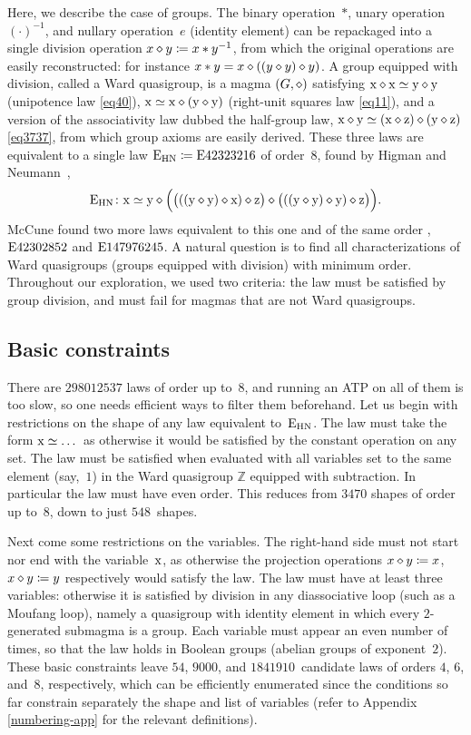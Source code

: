 Here, we describe the case of groups.  The binary operation~$*$, unary operation~$(\cdot )^{-1}$, and nullary operation~$e$ (identity element) can be repackaged into a single division operation $x \diamond y \coloneqq x*y^{-1}$, from which the original operations are easily reconstructed: for instance $x*y=x\diamond((y\diamond y)\diamond y)$.  A group equipped with division, called a Ward quasigroup, is a magma $(G, \diamond)$ satisfying $\mathrm{x} \diamond \mathrm{x} \simeq \mathrm{y} \diamond \mathrm{y}$ (unipotence law \eqref{eq40}), $\mathrm{x} \simeq \mathrm{x} \diamond (\mathrm{y} \diamond \mathrm{y})$ (right-unit squares law \eqref{eq11}), and a version of the associativity law dubbed the half-group law, $\mathrm{x} \diamond \mathrm{y} \simeq (\mathrm{x} \diamond \mathrm{z}) \diamond (\mathrm{y} \diamond \mathrm{z})$ \eqref{eq3737}, from which group axioms are easily derived.
These three laws are equivalent to a single law $\mathrm{E}_{\mathrm{HN}}\coloneqq \mathrm{E}42323216$ of order~$8$, found by Higman and Neumann~\cite{higman-neumann},
\[
\mathrm{E}_{\mathrm{HN}} \colon \mathrm{x} \simeq \mathrm{y} \diamond \Bigl(\bigl(((\mathrm{y} \diamond \mathrm{y}) \diamond \mathrm{x}) \diamond \mathrm{z}\bigr) \diamond \bigl(((\mathrm{y} \diamond \mathrm{y}) \diamond \mathrm{y}) \diamond \mathrm{z}\bigr)\Bigr) .
\]
McCune found two more laws equivalent to this one and of the same order \cite{mccune1993single}, $\mathrm{E}42302852$ and $\mathrm{E}147976245$.  A natural question is to find all characterizations of Ward quasigroups (groups equipped with division) with minimum order.
Throughout our exploration, we used two criteria: the law must be satisfied by group division, and must fail for magmas that are not Ward quasigroups.

\subsection{Basic constraints}

There are $\num{298012537}$ laws of order up to~$8$, and running an ATP on all of them is too slow, so one needs efficient ways to filter them beforehand.  Let us begin with restrictions on the shape of any law equivalent to~$\mathrm{E}_{\mathrm{HN}}$.
The law must take the form $\mathrm{x}\simeq\dots$ as otherwise it would be satisfied by the constant operation on any set.
The law must be satisfied when evaluated with all variables set to the same element (say,~$1$) in the Ward quasigroup $\mathbb{Z}$ equipped with subtraction.  In particular the law must have even order.
This reduces from $\num{3470}$ shapes of order up to~$8$, down to just $548$~shapes.

Next come some restrictions on the variables.
The right-hand side must not start nor end with the variable~$\mathrm{x}$, as otherwise the projection operations $x\diamond y \coloneqq x$, $x\diamond y\coloneqq y$ respectively would satisfy the law.
The law must have at least three variables: otherwise it is satisfied by division in any diassociative loop (such as a Moufang loop), namely a quasigroup with identity element in which every $2$-generated submagma is a group.
Each variable must appear an even number of times, so that the law holds in Boolean groups (abelian groups of exponent~$2$).
These basic constraints leave $54$, $\num{9000}$, and $\num{1841910}$~candidate laws of orders $4$, $6$, and~$8$, respectively, which can be efficiently enumerated since the conditions so far constrain separately the shape and list of variables (refer to Appendix \ref{numbering-app} for the relevant definitions).

